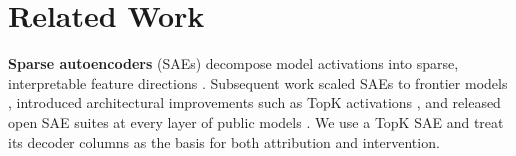 \documentclass{article}
\theoremstyle{plain}
\theoremstyle{definition}
\theoremstyle{remark}
\begin{document}




\section{Related Work}
\label{sec:related}

\textbf{Sparse autoencoders} (SAEs) decompose model activations into sparse, interpretable feature directions \citep{cunningham2023sparse,bricken2023monosemanticity}. Subsequent work scaled SAEs to frontier models \citep{templeton2024scaling}, introduced architectural improvements such as TopK activations \citep{gao2024scalingevaluatingsparseautoencoders}, and released open SAE suites at every layer of public models \citep{lieberum2024gemma}. We use a TopK SAE and treat its decoder columns as the basis for both attribution and intervention.
\end{document}
